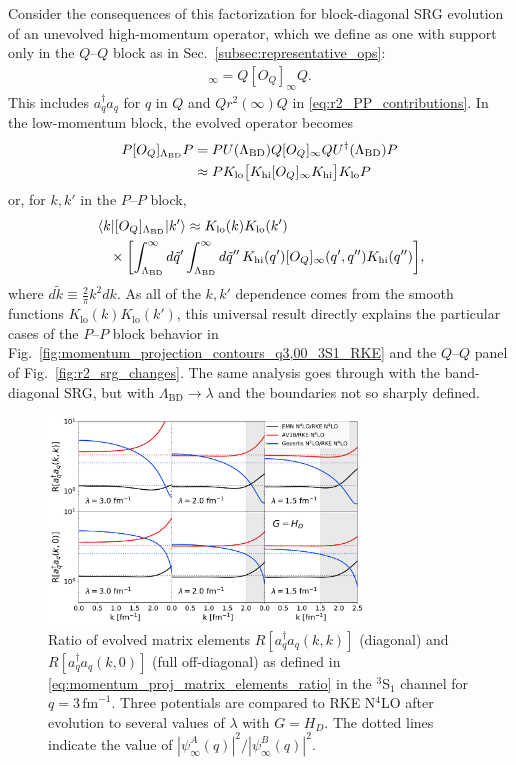 \documentclass[10pt,aps,prc,floatfix,twocolumn,nofootinbib]{revtex4-1}
\newcommand{\LambdaBD}{{\Lambda_{\text{BD}}}}
\newcommand{\ataq}{a^{\dagger}_q a_q}
\newcommand{\Klo}{K_{\text{lo}}}
\newcommand{\Khi}{K_{\text{hi}}}
\newcommand{\PP}{\ensuremath{P\mbox{--}P}}
\newcommand{\QQ}{\ensuremath{Q\mbox{--}Q}}
\begin{document}
Consider the consequences of this factorization for block-diagonal SRG evolution of an unevolved high-momentum operator, which we define as one with support only in the $\QQ$ block as in Sec.~\ref{subsec:representative_ops}:
%
\begin{align}
    [O_Q]_\infty = Q [O_Q]_\infty Q.
\end{align}
%
This includes $\ataq$ for $q$ in $Q$ and $Qr^2(\infty)Q$ in \eqref{eq:r2_PP_contributions}.
In the low-momentum block, the evolved operator becomes
%
\begin{align}
    P [O_Q]_\LambdaBD P &=
      P U(\LambdaBD)Q[O_Q]_\infty Q U^\dagger(\LambdaBD) P \notag \\
      &\approx P \Klo \bigl[\Khi [O_Q]_\infty \Khi\bigr] \Klo P
\end{align}
%
or, for $k,k'$ in the $\PP$ block,
%
\begin{align} \label{eq:factored_op}
   & \mel{k}{[O_Q]_\LambdaBD}{k'} \approx 
        \Klo(k) \Klo(k') \notag \\
  &  \quad \times
     \biggl[
      \int_{\LambdaBD}^{\infty} d\tilde{q}' 
      \int_{\LambdaBD}^{\infty} d\tilde{q}''\, \Khi(q') [O_Q]_\infty(q',q'') \Khi(q'')
     \biggr],
\end{align}
%
where $d\tilde{k} \equiv \frac{2}{\pi} k^2 dk$.
As all of the $k,k'$ dependence comes from the smooth functions $\Klo(k)\Klo(k')$, this universal result directly explains the particular cases of the $\PP$ block behavior in Fig.~\ref{fig:momentum_projection_contours_q3,00_3S1_RKE} and the $\QQ$ panel of Fig.~\ref{fig:r2_srg_changes}. 
The same analysis goes through with the band-diagonal SRG, but with $\LambdaBD \rightarrow \lambda$ and the boundaries not so sharply defined.

%
\begin{figure}[tbh]
	\includegraphics[clip,width=0.75\textwidth]{momentum_projection_ratios_q3p00_3S1_Wegner_kvnns_111_79_6_222.pdf}%
	\caption{Ratio of evolved matrix elements $R[\ataq(k,k)]$ (diagonal) and $R[\ataq(k,0)]$ (full off-diagonal) as defined in \eqref{eq:momentum_proj_matrix_elements_ratio} in the $^3$S$_1$ channel for $q = 3\,\mbox{fm}^{-1}$.
	Three potentials are compared to RKE N$^4$LO after evolution to several values of $\lambda$ with $G = H_D$.
	The dotted lines indicate the value of $|\psi^A_{\infty}(q)|^2 / |\psi^B_{\infty}(q)|^2$.}
	\label{fig:R_ratio_comparison}
\end{figure}
%
\end{document}
